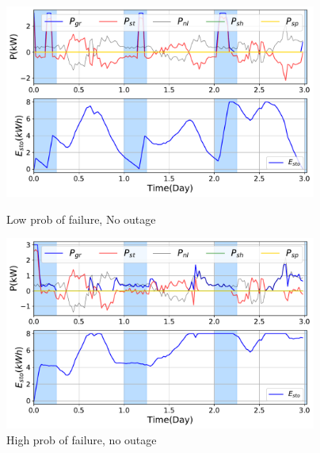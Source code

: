 \documentclass{ifacconf}
\begin{document}
 
\begin{figure}[!ht]
    \noindent  
    \begin{minipage}{.49\linewidth}
        \raggedleft
        \includegraphics[height=2.5in,width=1\columnwidth]{Figures/Mc_LowFailNoOut.pdf}
        \caption{Low prob of failure, No outage}
        \label{fig:LOwFailNoOut}    
    \end{minipage}%
    \begin{minipage}{.01\linewidth}
      \hspace{1px}
    \end{minipage}%
    \begin{minipage}{0.49\linewidth}
        \raggedright
        \includegraphics[height=2.5in,width=1\columnwidth]{Figures/Mc_HighFailNoOut.pdf} 
        \caption{High prob of failure, no outage}
        \label{fig:HighFailNoOut}
    \end{minipage}
\end{figure}
\end{document}

